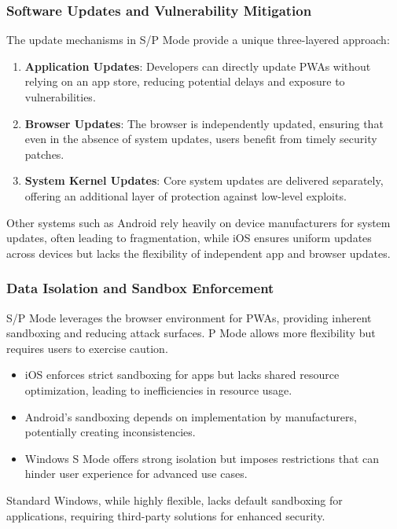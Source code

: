 \subsubsection{Software Updates and Vulnerability Mitigation}
The update mechanisms in S/P Mode provide a unique three-layered approach:
\begin{enumerate}
    \item \textbf{Application Updates}: Developers can directly update PWAs without relying on an app store, reducing potential delays and exposure to vulnerabilities.
    \item \textbf{Browser Updates}: The browser is independently updated, ensuring that even in the absence of system updates, users benefit from timely security patches.
    \item \textbf{System Kernel Updates}: Core system updates are delivered separately, offering an additional layer of protection against low-level exploits.
\end{enumerate}
Other systems such as Android rely heavily on device manufacturers for system updates, often leading to fragmentation, while iOS ensures uniform updates across devices but lacks the flexibility of independent app and browser updates.

\subsubsection{Data Isolation and Sandbox Enforcement}
S/P Mode leverages the browser environment for PWAs, providing inherent sandboxing and reducing attack surfaces. P Mode allows more flexibility but requires users to exercise caution. 
\begin{itemize}
    \item iOS enforces strict sandboxing for apps but lacks shared resource optimization, leading to inefficiencies in resource usage.
    \item Android's sandboxing depends on implementation by manufacturers, potentially creating inconsistencies.
    \item Windows S Mode offers strong isolation but imposes restrictions that can hinder user experience for advanced use cases.
\end{itemize}
Standard Windows, while highly flexible, lacks default sandboxing for applications, requiring third-party solutions for enhanced security.

